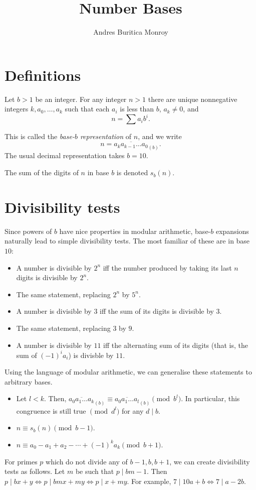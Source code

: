 \documentclass{article}
\title{Number Bases}
\author{Andres Buritica Monroy}
\date{}
\begin{document}
\maketitle
\section{Definitions}
Let $b>1$ be an integer. For any integer $n>1$ there are unique nonnegative
integers $k,a_0,\ldots,a_k$ such that each $a_i$ is less than $b$,
$a_k\ne 0$, and \[n=\sum a_i b^i.\]

This is called the \emph{base-$b$ representation} of $n$, and we write
\[n=\overline{a_k a_{k-1}\ldots a_0}_{(b)}.\]
The usual decimal representation takes $b=10$.

The sum of the digits of $n$ in base $b$ is denoted $s_b(n)$.
\section{Divisibility tests}
Since powers of $b$ have nice properties in modular arithmetic, base-$b$ expansions
naturally lead to simple divisibility tests. The most familiar of these are in
base $10$:
\begin{itemize}
	\item A number is divisible by $2^n$ iff the number produced by taking its
	      last $n$ digits is divisible by $2^n$.
	\item The same statement, replacing $2^n$ by $5^n$.
	\item A number is divisible by $3$ iff the sum of its digits is divisible by
	      $3$.
	\item The same statement, replacing $3$ by $9$.
	\item A number is divisible by $11$ iff the alternating sum of its digits
	      (that is, the sum of $(-1)^i a_i$) is divisble by $11$.
\end{itemize}
Using the language of modular arithmetic, we can generalise these statements to
arbitrary bases.
\begin{itemize}
	\item Let $l<k$. Then,
	      $\overline{a_0a_1\ldots a_k}_{(b)}\equiv \overline{a_0a_1\ldots
			      a_l}_{(b)}\pmod{b^l}$. In particular, this congruence is still true
	      $\pmod{d^l}$ for any $d\mid b$.
	\item $n\equiv s_b(n)\pmod{b-1}$.
	\item $n\equiv a_0-a_1+a_2-\cdots+(-1)^k a_k\pmod{b+1}$.
\end{itemize}
For primes $p$ which do not divide any of $b-1,b,b+1$,
we can create divisibility tests as follows. Let $m$ be
such that $p\mid bm-1$. Then $p\mid bx+y\iff p\mid bmx+my\iff p\mid
	x+my$. For example, $7\mid 10a+b\iff 7\mid a-2b$.
\end{document}
